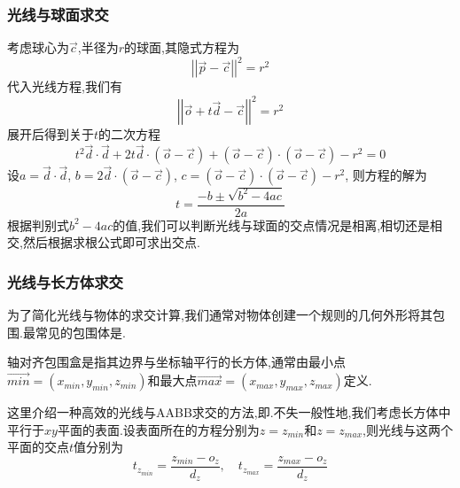 \documentclass{ctexart}
\begin{document}
\subsubsection{光线与球面求交}
考虑球心为$\vec{c}$,半径为$r$的球面,其隐式方程为
\[\left|\left|\vec{p}-\vec{c}\right|\right|^2=r^2\]
代入光线方程,我们有
\[\left|\left|\vec{o}+t\vec{d}-\vec{c}\right|\right|^2=r^2\]
展开后得到关于$t$的二次方程
\[t^2\vec{d}\cdot\vec{d}+2t\vec{d}\cdot(\vec{o}-\vec{c})+(\vec{o}-\vec{c})\cdot(\vec{o}-\vec{c})-r^2=0\]
设$a=\vec{d}\cdot\vec{d}$, $b=2\vec{d}\cdot(\vec{o}-\vec{c})$, $c=(\vec{o}-\vec{c})\cdot(\vec{o}-\vec{c})-r^2$, 则方程的解为
\[t=\frac{-b\pm\sqrt{b^2-4ac}}{2a}\]
根据判别式$b^2-4ac$的值,我们可以判断光线与球面的交点情况是相离,相切还是相交,然后根据求根公式即可求出交点.
\subsubsection{光线与长方体求交}
为了简化光线与物体的求交计算,我们通常对物体创建一个规则的几何外形将其包围.最常见的包围体是.
\begin{definition}[轴对齐包围盒]
    轴对齐包围盒是指其边界与坐标轴平行的长方体,通常由最小点$\vec{min}=(x_{min},y_{min},z_{min})$和最大点$\vec{max}=(x_{max},y_{max},z_{max})$定义.
\end{definition}
这里介绍一种高效的光线与AABB求交的方法,即.不失一般性地,我们考虑长方体中平行于$xy$平面的表面.设表面所在的方程分别为$z=z_{min}$和$z=z_{max}$,则光线与这两个平面的交点$t$值分别为
\[t_{z_{min}}=\frac{z_{min}-o_z}{d_z},\quad t_{z_{max}}=\frac{z_{max}-o_z}{d_z}\]
\end{document}
